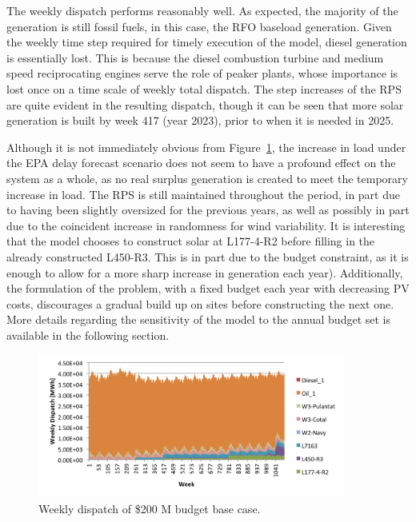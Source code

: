 \documentclass[12pt,letterpaper,fleqn]{article}
\begin{document}
The weekly dispatch performs reasonably well. As expected, the
majority of the generation is still fossil fuels, in this case, the
RFO baseload generation. Given the weekly time step required for
timely execution of the model, diesel generation is essentially
lost. This is because the diesel combustion turbine and medium speed
reciprocating engines serve the role of peaker plants, whose
importance is lost once on a time scale of weekly total dispatch. The
step increases of the RPS are quite evident in the resulting dispatch,
though it can be seen that more solar generation is built by week 417
(year 2023), prior to when it is needed in 2025. 

Although it is not immediately obvious from
Figure~\ref{fig:dispatch_base_case}, the increase in load under the
EPA delay forecast scenario does not seem to have a profound effect on
the system as a whole, as no real surplus generation is created to
meet the temporary increase in load. The RPS is still maintained
throughout the period, in part due to having been slightly oversized
for the previous years, as well as possibly in part due to the
coincident increase in randomness for wind variability. It is
interesting that the model chooses to construct solar at L177-4-R2
before filling in the already constructed L450-R3. This is in part due
to the budget constraint, as it is enough to allow for a more sharp
increase in generation each year). Additionally, the formulation of
the problem, with a fixed budget each year with decreasing PV costs,
discourages a gradual build up on sites before constructing the next
one. More details regarding the sensitivity of the model to the annual
budget set is available in the following section.

\begin{figure}[!h]
  \centering
  \includegraphics[width=0.9\textwidth]{img/dispatch_base_case}
  \caption{Weekly dispatch of \$200 M budget base case.}
  \label{fig:dispatch_base_case}
\end{figure}
\end{document}
